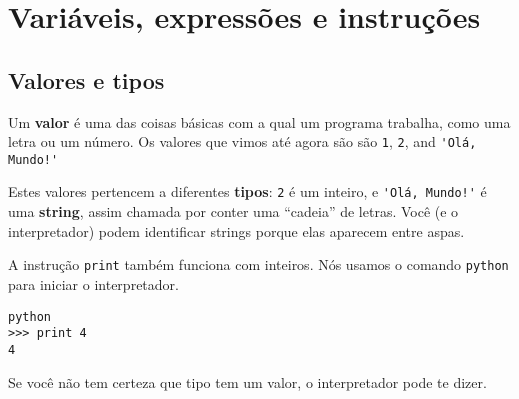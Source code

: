 
\chapter{Variáveis, expressões e instruções}
\section{Valores e tipos}

Um {\bf valor} é uma das coisas básicas com a qual um programa trabalha, 
como uma letra ou um número. Os valores que vimos até agora são
são {\tt 1}, {\tt 2}, and \verb"'Olá, Mundo!'"

Estes valores pertencem a diferentes {\bf tipos}:
{\tt 2} é um inteiro, e \verb"'Olá, Mundo!'" é uma {\bf string},
assim chamada por conter uma ``cadeia'' de letras.
Você (e o interpretador) podem identificar strings 
porque elas aparecem entre aspas.


A instrução {\tt print} também funciona com inteiros. Nós usamos o 
comando {\tt python} para iniciar o interpretador.

\beforeverb
\begin{verbatim}
python
>>> print 4
4
\end{verbatim}
\afterverb
%

Se você não tem certeza que tipo tem um valor, o interpretador pode te dizer.

